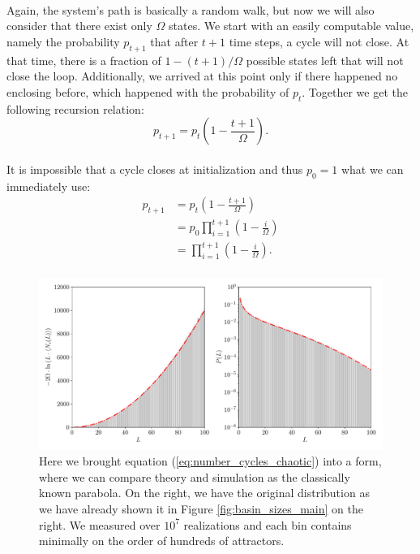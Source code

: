 \paragraph*{}
Again, the system's path is basically a random walk, but now we will also consider that there exist only $\Omega$ states. We start with an easily computable value, namely the probability $p_{t+1}$ that after $t+1$ time steps, a cycle will not close. At that time, there is a fraction of $1-(t+1)/\Omega$ possible states left that will not close the loop. Additionally, we arrived at this point only if there happened no enclosing before, which happened with the probability of $p_t$. Together we get the following recursion relation:
\begin{equation}
p_{t+1} = p_t \left(1-\frac{t+1}{\Omega}\right).
\end{equation}

\paragraph*{}
It is impossible that a cycle closes at initialization and thus $p_0 = 1$ what we can immediately use:
\begin{equation}
\begin{split}
p_{t+1} &= p_t \left(1-\frac{t+1}{\Omega}\right)\\
&= p_0 \prod\limits_{i=1}^{t+1} \left(1-\frac{i}{\Omega}\right)\\
&= \prod\limits_{i=1}^{t+1} \left(1-\frac{i}{\Omega}\right).
\end{split}
\end{equation}

\paragraph*{}
\begin{figure}[t]
	\includegraphics[width=\textwidth]{Plots/chaotic_hist}
	\centering
	\caption{Here we brought equation (\ref{eq:number_cycles_chaotic}) into a form, where we can compare theory and simulation as the classically known parabola. On the right, we have the original distribution as we have already shown it in Figure \ref{fig:basin_sizes_main} on the right. We measured over $ 10^7 $ realizations and each bin contains minimally on the order of hundreds of attractors.}
	\label{fig:quadratic_average_number_of_cycles}
\end{figure}

